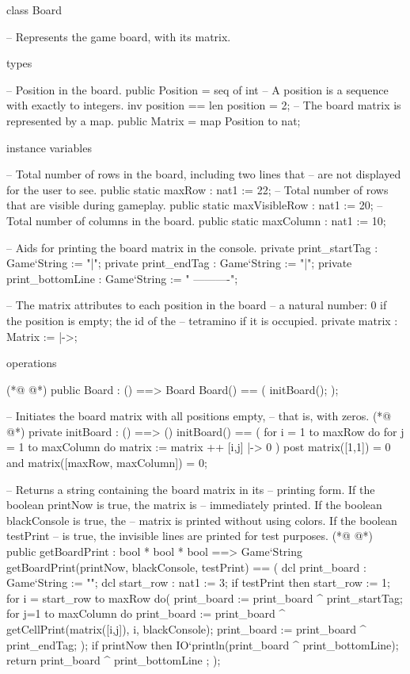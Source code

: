 \begin{vdmpp}[breaklines=true]
class Board

 -- Represents the game board, with its matrix.


 types
  
  -- Position in the board.
  public Position = seq of int
  -- A position is a sequence with exactly to integers.
  inv position == len position = 2;
  -- The board matrix is represented by a map.
  public Matrix = map Position to nat;


 instance variables
 
  -- Total number of rows in the board, including two lines that
  -- are not displayed for the user to see.
  public static maxRow  : nat1   := 22;
  -- Total number of rows that are visible during gameplay.
  public static maxVisibleRow : nat1   := 20;
  -- Total number of columns in the board.
  public static maxColumn  : nat1   := 10;

  -- Aids for printing the board matrix in the console.
  private print_startTag  : Game`String := "|";
  private print_endTag  : Game`String := "|\n";
  private print_bottomLine : Game`String := " ----------";
                                       
  -- The matrix attributes to each position in the board
  -- a natural number: 0 if the position is empty; the id of the
  -- tetramino if it is occupied.
  private matrix     : Matrix  := {|->};
     
                                                      
 operations
 
(*@
\label{Board:39}
@*)
  public Board : () ==> Board
  Board() == ( 
   initBoard();
  );
  
  -- Initiates the board matrix with all positions empty,
  -- that is, with zeros.
(*@
\label{initBoard:46}
@*)
  private initBoard : () ==> ()
  initBoard() == (  
   for i = 1 to maxRow do
    for j = 1 to maxColumn do
     matrix := matrix ++ {[i,j] |-> 0}
  )
  post matrix([1,1]) = 0 and matrix([maxRow, maxColumn]) = 0;

  -- Returns a string containing the board matrix in its
  -- printing form. If the boolean printNow is true, the matrix is
  -- immediately printed. If the boolean blackConsole is true, the
  -- matrix is printed without using colors. If the boolean testPrint
  -- is true, the invisible lines are printed for test purposes.
(*@
\label{getBoardPrint:59}
@*)
  public getBoardPrint : bool * bool * bool ==> Game`String
  getBoardPrint(printNow, blackConsole, testPrint) == ( 
   dcl print_board : Game`String := "\n";
   dcl start_row : nat1 := 3;
   if testPrint then start_row := 1;   
   for i = start_row to maxRow do(
    print_board := print_board ^ print_startTag;
      for j=1 to maxColumn do
       print_board := print_board 
        ^ getCellPrint(matrix([i,j]), i, blackConsole);
      print_board := print_board ^  print_endTag;
     );
     if printNow then
      IO`println(print_board ^ print_bottomLine);
    return print_board ^ print_bottomLine ;                   
  );
  

\end{vdmpp}
